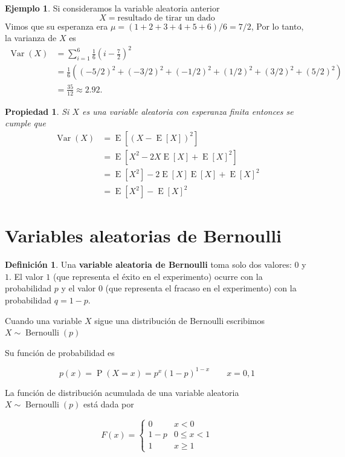 \documentclass[]{book}
\theoremstyle{plain}
\newtheorem{property}[theorem]{Propiedad}
\theoremstyle{definition}
\newtheorem{definition}[theorem]{Definición}
\newtheorem{example}[theorem]{Ejemplo}
\theoremstyle{definition} %
\begin{document}
\begin{example}
  Si consideramos la variable aleatoria anterior 
  \[X=\text{resultado de tirar un dado}\]
  Vimos que su esperanza era $\mu =  (1+2+3+4+5+6)/6=7/2$, Por lo tanto, la varianza de $X$ es 
  \[
  \begin{aligned}\operatorname {Var} (X)&=\sum _{i=1}^{6}{\frac {1}{6}}\left(i-{\frac {7}{2}}\right)^{2}\\[5pt]&={\frac {1}{6}}\left((-5/2)^{2}+(-3/2)^{2}+(-1/2)^{2}+(1/2)^{2}+(3/2)^{2}+(5/2)^{2}\right)\\[5pt]&={\frac {35}{12}}\approx 2.92.\end{aligned}
  \]
\end{example}

\begin{property}
  Si $X$ es una variable aleatoria con esperanza finita entonces se cumple que 
   \[
    \begin{aligned}\operatorname {Var} (X)&=\operatorname {E} 
      \left[(X-\operatorname {E} [X])^{2}\right]\\[4pt]&=\operatorname {E} 
      \left[X^{2}-2X\operatorname {E} [X]+\operatorname {E} [X]^{2}\right]\\[4pt]
      &=\operatorname {E} \left[X^{2}\right]-2\operatorname {E} [X]\operatorname {E} [X]+
      \operatorname {E} [X]^{2}\\[4pt]&=\operatorname {E} \left[X^{2}\right]-\operatorname {E} [X]^{2}\end{aligned}
 \]
\end{property}

\section{Variables aleatorias de
Bernoulli}

\begin{definition}
  Una \textbf{variable aleatoria de Bernoulli} toma solo dos valores:
\(0\) y \(1\). El valor \(1\) (que representa el éxito en el
experimento) ocurre con la probabilidad \(p\) y el valor \(0\) (que
representa el fracaso en el experimento) con la probabilidad
\(q = 1 - p\).

Cuando una variable \(X\) sigue una distribución de Bernoulli escribimos
\(\displaystyle X\sim \operatorname {Bernoulli} (p)\)

Su función de probabilidad es

\[\displaystyle p(x)=\operatorname {P} (X=x)=p^{x}(1-p)^{1-x}\qquad x=0,1\]

La función de distribución acumulada de una variable aleatoria
\(\displaystyle X\sim \operatorname {Bernoulli} (p)\) está dada por

\[\displaystyle F(x)={\begin{cases}0&x<0\\1-p&0\leq x<1\\1&x\geq 1\end{cases}}\]
\end{definition}
\end{document}
